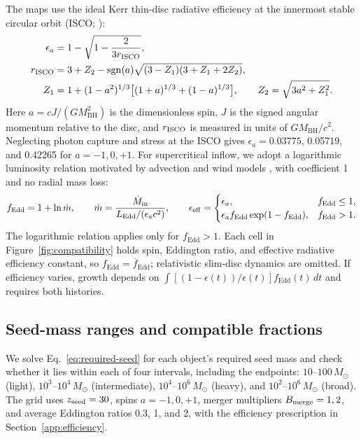 \documentclass[pdflatex,sn-basic]{sn-jnl}
\newcommand{\fedd}{f_{\mathrm{Edd}}}
\newcommand{\mbh}{M_{\mathrm{BH}}}
\begin{document}
The maps use the ideal Kerr thin-disc radiative efficiency at the innermost
stable circular orbit (ISCO; \citealt{bardeen1972}):
\begin{align}
\epsilon_a&=1-\sqrt{1-\frac{2}{3r_{\rm ISCO}}},\\
r_{\rm ISCO}&=3+Z_2-\operatorname{sgn}(a)
\sqrt{(3-Z_1)(3+Z_1+2Z_2)},\\
Z_1&=1+(1-a^2)^{1/3}\big[(1+a)^{1/3}+(1-a)^{1/3}\big],\qquad
Z_2=\sqrt{3a^2+Z_1^2}.
\label{eq:spin}
\end{align}
Here $a=cJ/(G\mbh^2)$ is the dimensionless spin, $J$ is the signed angular
momentum relative to the disc, and $r_{\rm ISCO}$ is measured in units of
$G\mbh/c^2$. Neglecting photon capture and stress at the ISCO gives
$\epsilon_a=0.03775$, 0.05719, and 0.42265 for $a=-1,0,+1$.
For supercritical inflow, we adopt a logarithmic luminosity relation motivated
by advection and wind models \citep{poutanen2007}, with coefficient 1 and no
radial mass loss:
\begin{equation}
\fedd=1+\ln\dot m,\qquad
\dot m=\frac{\dot M_{\rm in}}{L_{\rm Edd}/(\epsilon_a c^2)},\qquad
\epsilon_{\rm eff}=\begin{cases}
\epsilon_a,&\fedd\leq1,\\
\epsilon_a\fedd\exp(1-\fedd),&\fedd>1.
\end{cases}
\label{eq:effective-efficiency}
\end{equation}
The logarithmic relation applies only for $\fedd>1$. Each cell in
Figure~\ref{fig:compatibility} holds spin, Eddington ratio, and effective
radiative efficiency constant, so $\fedd=\overline{f}_{\mathrm{Edd}}$;
relativistic slim-disc dynamics are omitted. If efficiency varies, growth
depends on $\int [(1-\epsilon(t))/\epsilon(t)]\fedd(t)\,dt$ and requires
both histories.




\subsection{Seed-mass ranges and compatible fractions}
\label{sec:compatibility}

We solve Eq.~\ref{eq:required-seed} for each object's required seed mass and
check whether it lies within each of four intervals, including the endpoints:
$10$--$100\,M_\odot$ (light), $10^3$--$10^4\,M_\odot$ (intermediate),
$10^4$--$10^6\,M_\odot$ (heavy), and $10^2$--$10^6\,M_\odot$ (broad).
The grid uses $z_{\rm seed}=30$, spins $a=-1,0,+1$, merger multipliers
$B_{\rm merge}=1,2$, and average Eddington ratios 0.3, 1, and 2, with the
efficiency prescription in Section~\ref{app:efficiency}.
\end{document}
